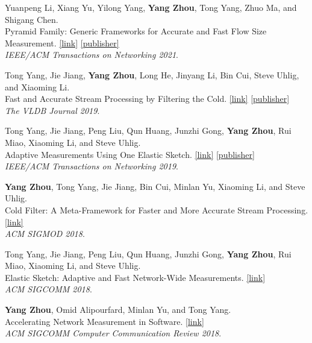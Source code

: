 \documentclass[letterpaper, 11pt]{article}
\newcounter{mySaveCounter}
\newenvironment{myEnumerateCitation}{%
  \begin{enumerate}[label={[\arabic*]},ref={[\arabic*]}]
    \usecounter{enumi}%
    \setcounter{enumi}{\value{mySaveCounter}}
    \setlength{\itemsep}{0pt}%
    \setlength{\parskip}{5pt}%
}
{%
  \setcounter{mySaveCounter}{\value{enumi}}\end{enumerate}%
}
\begin{document}
\begin{myEnumerateCitation}
\item Yuanpeng Li, Xiang Yu, Yilong Yang, \textbf{Yang Zhou}, Tong Yang, Zhuo Ma, and Shigang Chen. 
\\Pyramid Family: Generic Frameworks for Accurate and Fast Flow Size Measurement. \href{https://yangzhou1997.github.io/paper/pyramid_family_ton21.pdf}{[link]} \href{https://ieeexplore.ieee.org/document/9604765}{[publisher]}
\\\textit{IEEE/ACM Transactions on Networking 2021}.

\item Tong Yang, Jie Jiang, \textbf{Yang Zhou}, Long He, Jinyang Li, Bin Cui, Steve Uhlig, and Xiaoming Li. 
\\Fast and Accurate Stream Processing by Filtering the Cold. \href{https://yangzhou1997.github.io/paper/filtering_cold_vldbj19.pdf}{[link]} \href{https://link.springer.com/article/10.1007/s00778-019-00560-1}{[publisher]}
\\\textit{The VLDB Journal 2019}.

\item Tong Yang, Jie Jiang, Peng Liu, Qun Huang, Junzhi Gong, \textbf{Yang Zhou}, Rui Miao, Xiaoming Li, and Steve Uhlig. 
\\Adaptive Measurements Using One Elastic Sketch. \href{https://yangzhou1997.github.io/paper/elastic_ton2019.pdf}{[link]} \href{https://ieeexplore.ieee.org/document/8886725}{[publisher]}
\\\textit{IEEE/ACM Transactions on Networking 2019}.

\item \textbf{Yang Zhou}, Tong Yang, Jie Jiang, Bin Cui, Minlan Yu, Xiaoming Li, and Steve Uhlig. 
\\Cold Filter: A Meta-Framework for Faster and More Accurate Stream Processing. \href{https://dl.acm.org/doi/epdf/10.1145/3183713.3183726}{[link]}
\\\textit{ACM SIGMOD 2018}.

\item Tong Yang, Jie Jiang, Peng Liu, Qun Huang, Junzhi Gong, \textbf{Yang Zhou}, Rui Miao, Xiaoming Li, and Steve Uhlig. 
\\Elastic Sketch: Adaptive and Fast Network-Wide Measurements. \href{https://dl.acm.org/doi/epdf/10.1145/3230543.3230544}{[link]}
\\\textit{ACM SIGCOMM 2018}.

\item \textbf{Yang Zhou}, Omid Alipourfard, Minlan Yu, and Tong Yang. 
\\Accelerating Network Measurement in Software. \href{https://ccronline.sigcomm.org/wp-content/uploads/2018/07/sigcomm-ccr-final197.pdf}{[link]}
\\\textit{ACM SIGCOMM Computer Communication Review 2018}.


\end{myEnumerateCitation}
\end{document}
